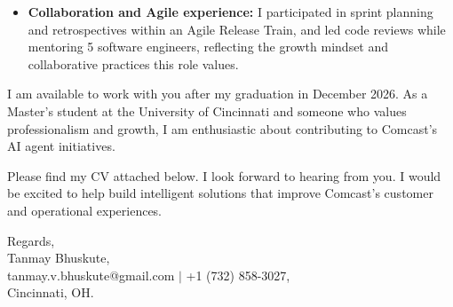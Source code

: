 \documentclass[11pt]{letter}
\begin{document}
\begin{letter}{}
\begin{itemize}[leftmargin=*, itemsep=0.45em]
    \item \textbf{Collaboration and Agile experience:} I participated in sprint planning and retrospectives within an Agile Release Train, and led code reviews while mentoring 5 software engineers, reflecting the growth mindset and collaborative practices this role values.
\end{itemize}

I am available to work with you after my graduation in December 2026. As a Master's student at the University of Cincinnati and someone who values professionalism and growth, I am enthusiastic about contributing to Comcast's AI agent initiatives.

Please find my CV attached below. I look forward to hearing from you. I would be excited to help build intelligent solutions that improve Comcast's customer and operational experiences.

{\setlength{\parskip}{0pt}
Regards,\\
Tanmay Bhuskute,\\
tanmay.v.bhuskute@gmail.com $\mid$ +1 (732) 858-3027,\\
Cincinnati, OH.
}

\end{letter}
\end{document}

